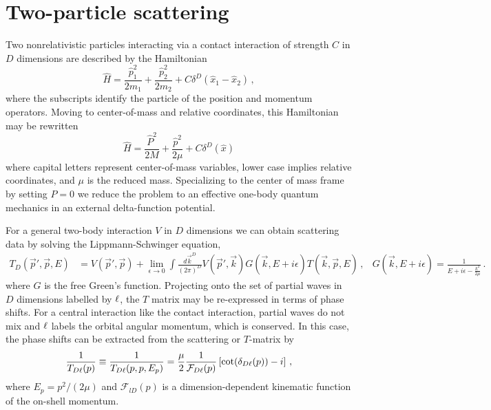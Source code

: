 \section{Two-particle scattering}\label{sec:scattering}

Two nonrelativistic particles interacting via a contact interaction of strength $C$ in $D$ dimensions are described by the Hamiltonian
\begin{equation}
    \label{eq:particle hamiltonian}
    \hat H = \frac{\hat p_1^2}{2 m_1} + \frac{\hat p_2^2}{2 m_2} + C \delta^D(\hat x_1 - \hat x_2)
    \,,
\end{equation}
where the subscripts identify the particle of the position and momentum operators.
Moving to center-of-mass and relative coordinates, this Hamiltonian may be rewritten
\begin{equation}
    \label{eq:hamiltonian}
    \hat H = \frac{\hat P^2}{2 M} + \frac{\hat p^2}{2 \mu} + C\delta^D(\hat{x})
\end{equation}
where capital letters represent center-of-mass variables, lower case implies relative coordinates, and $\mu$ is the reduced mass.
Specializing to the center of mass frame by setting $P=0$ we reduce the problem to an effective one-body quantum mechanics in an external delta-function potential.

For a general two-body interaction $V$ in $D$ dimensions we can obtain scattering data by solving the Lippmann-Schwinger equation,
\begin{align}
	T_D(\vec p', \vec p, E)
	&=
	V(\vec p', \vec p) + \lim\limits_{\epsilon \to 0}\int \frac{d \vec k^D}{(2\pi)^D} V(\vec p', \vec k) G(\vec k, E + i \epsilon) T(\vec k, \vec p, E) \, ,
	&
	G(\vec k, E+ i \epsilon) = \frac{1}{E + i \epsilon - \frac{k^2}{2\mu}}
	\, .
\end{align}
where $G$ is the free Green's function.
Projecting onto the set of partial waves in $D$ dimensions labelled by $\ell$, the $T$ matrix may be re-expressed in terms of phase shifts.
For a central interaction like the contact interaction, partial waves do not mix and $\ell$ labels the orbital angular momentum, which is conserved.
In this case, the phase shifts can be extracted from the scattering or $T$-matrix by
\begin{align}\label{eq:on-shell-T}
	\frac{1}{T_{D\ell}(p)}
    \equiv
    \frac{1}{T_{D\ell}(p, p, E_p)}
    = \frac{\mu}{2}
    \frac{1}{\mathcal F_{D\ell}(p)} \left[\cot (\delta_{D\ell}(p)) - i\right] \, ,
\end{align}
where $E_p = p^2 / (2 \mu)$ and $\mathcal F_{l D}(p)$ is a dimension-dependent kinematic function of the on-shell momentum.

